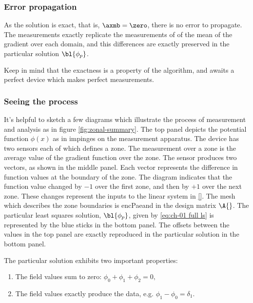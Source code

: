 \subsubsection{Error propagation} 
As the solution is exact, that is, $\axmb = \zero$, there is no error to propagate. The measurements exactly replicate the measurements of of the mean of the gradient over each domain, and this differences are exactly preserved in the particular solution $\bl{\phi_{p}}$.

Keep in mind that the exactness is a property of the algorithm, and awaits a perfect device which makes perfect measurements. 

\subsubsection{Seeing the process} 

It's helpful to sketch a few diagrams which illustrate the process of measurement and analysis as in figure \ref{fig:zonal-summary}. The top panel depicts the potential function $\phi(x)$ as in impinges on the measurement apparatus. The device has two sensors each of which defines a zone. The measurement over a zone is the average value of the gradient function over the zone. The sensor produces two vectors, as shown in the middle panel. Each vector represents the difference in function values at the boundary of the zone. The diagram indicates that the function value changed by $-1$ over the first zone, and then by $+1$ over the next zone. These changes represent the inputs to the linear system in \eqref{}. The mesh which describes the zone boundaries is encPaeand in the design matrix $\A{}$. The particular least squares solution, $\bl{\phi_{p}}$, given by \eqref{eq:ch-01 full ls} is represented by the blue sticks in the bottom panel. The offsets between the values in the top panel are exactly reproduced in the particular solution in the bottom panel. 

The particular solution exhibits two important properties:
\begin{enumerate}
	\item The field values sum to zero: $\phi_{0} + \phi_{1} + \phi_{2} = 0,$
	\item The field values exactly produce the data, e.g. $\phi_{1} - \phi_{0} = \delta_{1}.$
\end{enumerate}

